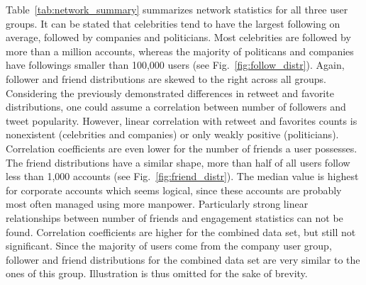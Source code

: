 Table~\ref{tab:network_summary} summarizes network statistics for all three
user groups.
It can be stated that celebrities tend to have the largest following on average,
followed by companies and politicians.
Most celebrities are followed by more than a million accounts, whereas the
majority of politicans and companies have followings smaller than 100,000 
users (see Fig.~\ref{fig:follow_distr}).
Again, follower and friend distributions are skewed to the right across all
groups.
Considering the previously demonstrated differences in retweet and favorite
distributions, one could assume a correlation between number of followers
and tweet popularity.
However, linear correlation with retweet and favorites counts is nonexistent
(celebrities and companies) or only weakly positive (politicians).
Correlation coefficients are even lower for the number of friends a user
possesses.
The friend distributions have a similar shape, more than half of all users
follow less than 1,000 accounts (see Fig.~\ref{fig:friend_distr}).
The median value is highest for corporate accounts which seems logical, since
these accounts are probably most often managed using more manpower.
Particularly strong linear relationships between number of friends and engagement statistics can not
be found.
Correlation coefficients are higher for the combined data set, but still not
significant.
Since the majority of users come from the company user group, follower and friend
distributions for the combined data set are very similar to the ones of this group.
Illustration is thus omitted for the sake of brevity.

